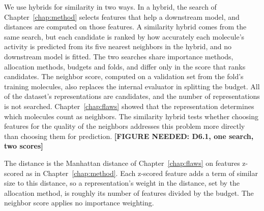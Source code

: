 We use hybrids for similarity in two ways. In a hybrid, the search of Chapter~\ref{chap:method} selects features that help a downstream model, and distances are computed on those features. A similarity hybrid comes from the same search, but each candidate is ranked by how accurately each molecule's activity is predicted from its five nearest neighbors in the hybrid, and no downstream model is fitted. The two searches share importance methods, allocation methods, budgets and folds, and differ only in the score that ranks candidates. The neighbor score, computed on a validation set from the fold's training molecules, also replaces the internal evaluator in splitting the budget. All of the dataset's representations are candidates, and the number of representations is not searched. Chapter~\ref{chap:flaws} showed that the representation determines which molecules count as neighbors. The similarity hybrid tests whether choosing features for the quality of the neighbors addresses this problem more directly than choosing them for prediction. \textbf{[FIGURE NEEDED: D6.1, one search, two scores]}

The distance is the Manhattan distance of Chapter~\ref{chap:flaws} on features z-scored as in Chapter~\ref{chap:method}. Each z-scored feature adds a term of similar size to this distance, so a representation's weight in the distance, set by the allocation method, is roughly its number of features divided by the budget. The neighbor score applies no importance weighting.

